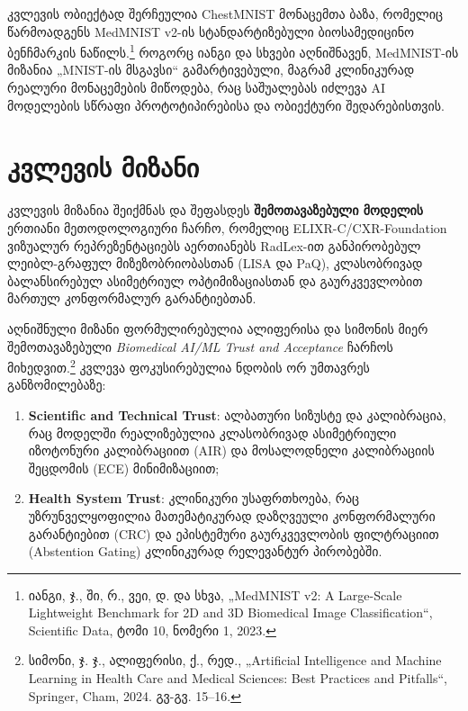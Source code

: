 \documentclass[12pt,a4paper,oneside]{report}
\begin{document}
კვლევის ობიექტად შერჩეულია ChestMNIST მონაცემთა ბაზა, რომელიც წარმოადგენს MedMNIST v2-ის სტანდარტიზებული ბიოსამედიცინო ბენჩმარკის ნაწილს.\footnote{იანგი, ჯ., ში, რ., ვეი, დ. და სხვა, „MedMNIST v2: A Large-Scale Lightweight Benchmark for 2D and 3D Biomedical Image Classification“, Scientific Data, ტომი 10, ნომერი 1, 2023.} როგორც იანგი და სხვები აღნიშნავენ, MedMNIST-ის მიზანია „MNIST-ის მსგავსი“ გამარტივებული, მაგრამ კლინიკურად რეალური მონაცემების მიწოდება, რაც საშუალებას იძლევა AI მოდელების სწრაფი პროტოტიპირებისა და ობიექტური შედარებისთვის.

\section{კვლევის მიზანი}
კვლევის მიზანია შეიქმნას და შეფასდეს \textbf{შემოთავაზებული მოდელის} ერთიანი მეთოდოლოგიური ჩარჩო, რომელიც ELIXR-C/CXR-Foundation ვიზუალურ რეპრეზენტაციებს აერთიანებს RadLex-ით განპირობებულ ლეიბლ-გრაფულ მიზეზობრიობასთან (LISA და PaQ), კლასობრივად ბალანსირებულ ასიმეტრიულ ოპტიმიზაციასთან და გაურკვევლობით მართულ კონფორმალურ გარანტიებთან. 

აღნიშნული მიზანი ფორმულირებულია ალიფერისა და სიმონის მიერ შემოთავაზებული \textit{Biomedical AI/ML Trust and Acceptance} ჩარჩოს მიხედვით.\footnote{სიმონი, ჯ. ჯ., ალიფერისი, ქ., რედ., „Artificial Intelligence and Machine Learning in Health Care and Medical Sciences: Best Practices and Pitfalls“, Springer, Cham, 2024. გვ-გვ. 15–16.} კვლევა ფოკუსირებულია ნდობის ორ უმთავრეს განზომილებაზე:
\begin{enumerate}
    \item \textbf{Scientific and Technical Trust}: ალბათური სიზუსტე და კალიბრაცია, რაც მოდელში რეალიზებულია კლასობრივად ასიმეტრიული იზოტონური კალიბრაციით (AIR) და მოსალოდნელი კალიბრაციის შეცდომის (ECE) მინიმიზაციით;
    \item \textbf{Health System Trust}: კლინიკური უსაფრთხოება, რაც უზრუნველყოფილია მათემატიკურად დაზღვეული კონფორმალური გარანტიებით (CRC) და ეპისტემური გაურკვევლობის ფილტრაციით (Abstention Gating) კლინიკურად რელევანტურ პირობებში.
\end{enumerate}
\end{document}
